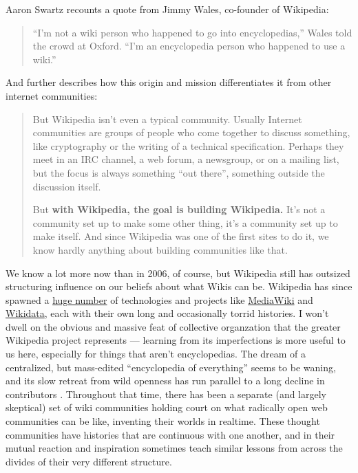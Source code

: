 \documentclass[notoc]{tufte-book}
\begin{document}
Aaron Swartz recounts a quote from Jimmy Wales, co-founder of Wikipedia:

\begin{quote}
``I'm not a wiki person who happened to go into encyclopedias,'' Wales
told the crowd at Oxford. ``I'm an encyclopedia person who happened to
use a wiki.'' \citep{swartzWhoWritesWikipedia2006} 
\end{quote}

And further describes how this origin and mission differentiates it from
other internet communities:

\begin{quote}
But Wikipedia isn't even a typical community. Usually Internet
communities are groups of people who come together to discuss something,
like cryptography or the writing of a technical specification. Perhaps
they meet in an IRC channel, a web forum, a newsgroup, or on a mailing
list, but the focus is always something ``out there'', something outside
the discussion itself.

But \textbf{with Wikipedia, the goal is building Wikipedia.} It's not a
community set up to make some other thing, it's a community set up to
make itself. And since Wikipedia was one of the first sites to do it, we
know hardly anything about building communities like that. \citep{swartzMakingMoreWikipedias2006} 
\end{quote}

We know a lot more now than in 2006, of course, but Wikipedia still has
outsized structuring influence on our beliefs about what Wikis can be.
Wikipedia has since spawned a
\href{https://meta.wikimedia.org/wiki/Complete_list_of_Wikimedia_projects}{huge
number} of technologies and projects like
\href{https://meta.wikimedia.org/wiki/MediaWiki}{MediaWiki} and
\href{https://meta.wikimedia.org/wiki/Wikidata}{Wikidata}, each with
their own long and occasionally torrid histories. I won't dwell on the
obvious and massive feat of collective organzation that the greater
Wikipedia project represents --- learning from its imperfections is more
useful to us here, especially for things that aren't encyclopedias. The
dream of a centralized, but mass-edited ``encyclopedia of everything''
seems to be waning, and its slow retreat from wild openness has run
parallel to a long decline in contributors \citep{hillWikipediaEndOpen2019, halfakerRiseDeclineOpen2013} . Throughout
that time, there has been a separate (and largely skeptical) set of wiki
communities holding court on what radically open web communities can be
like, inventing their worlds in realtime. These thought communities have
histories that are continuous with one another, and in their mutual
reaction and inspiration sometimes teach similar lessons from across the
divides of their very different structure.
\end{document}
